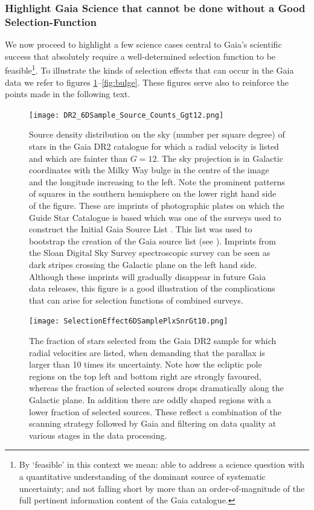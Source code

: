 \subsubsection{Highlight Gaia Science that cannot be done without a Good Selection-Function}
\label{sec:notpossible}

We now proceed to highlight a few science cases central to Gaia's scientific success that absolutely require a well-determined selection function to be feasible\footnote{By `feasible' in this context we mean: able to address a science question with a quantitative understanding of the dominant source of systematic uncertainty; and not falling short by more than an order-of-magnitude of the full pertinent information content of the Gaia catalogue.}. To illustrate the kinds of selection effects that can occur in the Gaia data we refer to figures \ref{fig:6dsample}--\ref{fig:bulge}. These figures serve also to reinforce the points made in the following text.
\\

\begin{figure}
    \centering
    \texttt{[image: DR2\_6DSample\_Source\_Counts\_Ggt12.png]}
    \caption{Source density distribution on the sky (number per square degree) of stars in the Gaia DR2 catalogue for which a radial velocity is listed and which are fainter than $G=12$. The sky projection is in Galactic coordinates with the Milky Way bulge in the centre of the image and the longitude increasing to the left. Note the prominent patterns of squares in the southern hemisphere on the lower right hand side of the figure. These are imprints of photographic plates on which the Guide Star Catalogue is based which was one of the surveys used to construct the Initial Gaia Source List \cite{2014A&A...570A..87S}. This list was used to bootstrap the creation of the Gaia source list (see ). Imprints from the Sloan Digital Sky Survey spectroscopic survey can be seen as dark stripes crossing the Galactic plane on the left hand side. Although these imprints will gradually disappear in future Gaia data releases, this figure is a good illustration of the complications that can arise for selection functions of combined surveys.}
    \label{fig:6dsample}
\end{figure}

\begin{figure}
    \centering
    \texttt{[image: SelectionEffect6DSamplePlxSnrGt10.png]}
    \caption{The fraction of stars selected from the Gaia DR2 sample for which radial velocities are listed, when demanding that the parallax is larger than 10 times its uncertainty. Note how the ecliptic pole regions on the top left and bottom right are strongly favoured, whereas the fraction of selected sources drops dramatically along the Galactic plane. In addition there are oddly shaped regions with a lower fraction of selected sources. These reflect a combination of the scanning strategy followed by Gaia and filtering on data quality at various stages in the data processing.}
    \label{fig:6dplxsnrgt10}
\end{figure}

